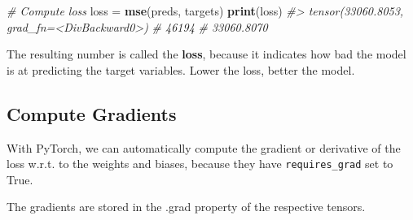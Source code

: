 \documentclass[]{book}
\newenvironment{Shaded}{\begin{snugshade}}{\end{snugshade}}
\newcommand{\CommentTok}[1]{\textcolor[rgb]{0.56,0.35,0.01}{\textit{#1}}}
\newcommand{\KeywordTok}[1]{\textcolor[rgb]{0.13,0.29,0.53}{\textbf{#1}}}
\newcommand{\NormalTok}[1]{#1}
\newcommand{\OperatorTok}[1]{\textcolor[rgb]{0.81,0.36,0.00}{\textbf{#1}}}
\newcommand{\StringTok}[1]{\textcolor[rgb]{0.31,0.60,0.02}{#1}}
\begin{document}
\begin{Shaded}
\begin{Highlighting}[]
\CommentTok{# Compute loss}
\NormalTok{loss =}\StringTok{ }\KeywordTok{mse}\NormalTok{(preds, targets)}
\KeywordTok{print}\NormalTok{(loss)}
\CommentTok{#> tensor(33060.8053, grad_fn=<DivBackward0>)}
\CommentTok{# 46194}
\CommentTok{# 33060.8070}
\end{Highlighting}
\end{Shaded}

The resulting number is called the \textbf{loss}, because it indicates how bad the model is at predicting the target variables. Lower the loss, better the model.

\hypertarget{compute-gradients}{%
\subsection{Compute Gradients}\label{compute-gradients}}

With PyTorch, we can automatically compute the gradient or derivative of the loss w.r.t. to the weights and biases, because they have \texttt{requires\_grad} set to True.

\begin{Shaded}
\end{Shaded}

The gradients are stored in the .grad property of the respective tensors.

\begin{Shaded}
\end{Shaded}

\begin{Shaded}
\end{Shaded}
\end{document}
